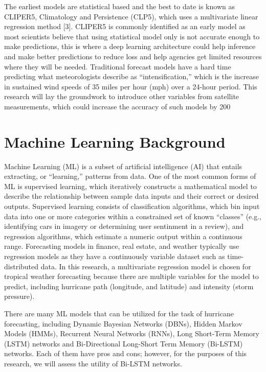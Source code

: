 \documentclass{article}
\begin{document}
The earliest models are statistical based and the best to date is known as CLIPER5, Climatology and Persistence (CLP5), which uses a multivariate linear regression method [3]. %
CLIPER5 is commonly identified as an early model as most scientists believe that using statistical model only is not accurate enough to make predictions, this is where a deep learning architecture could help inference and make better predictions to reduce loss and help agencies get limited resources where they will be needed. %
Traditional forecast models have a hard time predicting what meteorologists describe as ``intensification,'' which is the increase in sustained wind speeds of 35 miles per hour (mph) over a 24-hour period. This research will lay the groundwork to introduce other variables from satellite measurements, which could increase the accuracy of such models by 200%

\section{Machine Learning Background}
Machine Learning (ML) is a subset of artificial intelligence (AI) that entails extracting, or ``learning,'' patterns from data. One of the most common forms of ML is supervised learning, which iteratively constructs a mathematical model to describe the relationship between sample data inputs and their correct or desired outputs. Supervised learning consists of classification algorithms, which bin input data into one or more categories within a constrained set of known ``classes'' (e.g., identifying cars in imagery or determining user sentinment in a review), and regression algorithms, which estimate a numeric output within a continuous range. Forecasting models in finance, real estate, and weather typically use regression models as they have a continuously variable dataset such as time-distributed data. In this research, a multivariate regression model is chosen for tropical weather forecasting because there are multiple variables for the model to predict, including hurricane path (longitude, and latitude) and intensity (storm pressure). 

There are many ML models that can be utilized for the task of hurricane forecasting, including Dynamic Bayesian Networks (DBNs), Hidden Markov Models (HMMs), Recurrent Neural Networks (RNNs), Long Short-Term Memory (LSTM) networks and Bi-Directional Long-Short Term Memory (Bi-LSTM) networks. Each of them have pros and cons; however, for the purposes of this research, we will assess the utility of Bi-LSTM networks. %
\end{document}
